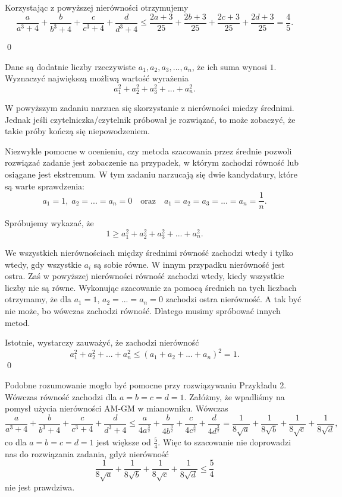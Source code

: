 \noindent 
Korzystając z powyższej nierówności otrzymujemy
\[
    \frac{a}{a^3 + 4} + \frac{b}{b^3 + 4} + \frac{c}{c^3 + 4} + \frac{d}{d^3 + 4} \leqslant \frac{2a + 3}{25} + \frac{2b + 3}{25} + \frac{2c + 3}{25} + \frac{2d + 3}{25} = \frac{4}{5}.
\]

\qed

\vspace{5px}


\noindent
Dane są dodatnie liczby rzeczywiste $a_1, a_2, a_3, ..., a_n$, że ich suma wynosi $1$. Wyznaczyć największą możliwą wartość wyrażenia
\[
    a_1^2 + a_2^2 + a_3^2 + ... + a_n^2.
\]

\newpage
{}

\noindent
W powyższym zadaniu narzuca się skorzystanie z nierówności miedzy średnimi. Jednak jeśli czytelniczka/czytelnik próbował je rozwiązać, to może zobaczyć, że takie próby kończą się niepowodzeniem.

Niezwykle pomocne w ocenieniu, czy metoda szacowania przez średnie pozwoli rozwiązać zadanie jest zobaczenie na przypadek, w którym zachodzi równość lub osiągane jest ekstremum. W tym zadaniu narzucają się dwie kandydatury, które są warte sprawdzenia:
\[
    a_1 = 1, \; a_2 = ... = a_n = 0 \quad \text{oraz} \quad a_1 = a_2 = a_3 = ... = a_n = \frac{1}{n}.
\]

Spróbujemy wykazać, że
\[
    1 \geqslant a_1^2 + a_2^2 + a_3^2 + ... + a_n^2.
\]

\noindent
We wszystkich nierównościach między średnimi równość zachodzi wtedy i tylko wtedy, gdy wszystkie $a_i$ są sobie równe. W innym przypadku nierówność jest ostra. Zaś w powyższej nierówności równość zachodzi wtedy, kiedy wszystkie liczby nie są równe. Wykonując szacowanie za pomocą średnich na tych liczbach otrzymamy, że dla $a_1 = 1$,  ${a_2 = ... = a_n = 0}$ zachodzi ostra nierówność. A tak być nie może, bo wówczas zachodzi równość. Dlatego musimy spróbować innych metod.

\noindent 
Istotnie, wystarczy zauważyć, że zachodzi nierówność
\[
    a_1^2 + a_2^2 + ... + a_n^2 \leqslant (a_1 + a_2 + ... + a_n)^2 = 1.
\]
\qed

\vspace{10px}

\noindent 
Podobne rozumowanie mogło być pomocne przy rozwiązywaniu Przykładu 2. Wówczas równość zachodzi dla $a = b = c = d = 1$. Załóżmy, że wpadliśmy na pomysł użycia nierówności AM-GM w mianowniku. Wówczas
\[
    \frac{a}{a^3 + 4} + \frac{b}{b^3 + 4} + \frac{c}{c^3 + 4} + \frac{d}{d^3 + 4} \leqslant \frac{a}{4a^{\frac{3}{2}}} + \frac{b}{4b^{\frac{3}{2}}} + \frac{c}{4c^{\frac{3}{2}}} + \frac{d}{4d^{\frac{3}{2}}} = \frac{1}{8\sqrt{a}} +  \frac{1}{8\sqrt{b}} +  \frac{1}{8\sqrt{c}} +  \frac{1}{8\sqrt{d}},
\]
co dla $a = b = c = d = 1$ jest większe od $\frac{5}{4}$. Więc to szacowanie nie doprowadzi nas do rozwiązania zadania, gdyż nierówność
\[
    \frac{1}{8\sqrt{a}} +  \frac{1}{8\sqrt{b}} +  \frac{1}{8\sqrt{c}} +  \frac{1}{8\sqrt{d}} \leqslant \frac{5}{4}
\]
nie jest prawdziwa.

\vspace{10px}